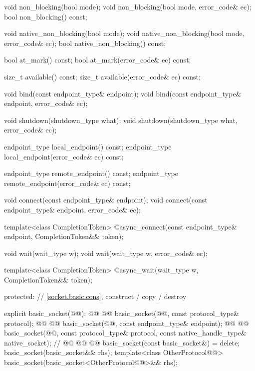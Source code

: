 \begin{codeblock}
{{    void non_blocking(bool mode);
    void non_blocking(bool mode, error_code& ec);
    bool non_blocking() const;

    void native_non_blocking(bool mode);
    void native_non_blocking(bool mode, error_code& ec);
    bool native_non_blocking() const;

    bool at_mark() const;
    bool at_mark(error_code& ec) const;

    size_t available() const;
    size_t available(error_code& ec) const;

    void bind(const endpoint_type& endpoint);
    void bind(const endpoint_type& endpoint, error_code& ec);

    void shutdown(shutdown_type what);
    void shutdown(shutdown_type what, error_code& ec);

    endpoint_type local_endpoint() const;
    endpoint_type local_endpoint(error_code& ec) const;

    endpoint_type remote_endpoint() const;
    endpoint_type remote_endpoint(error_code& ec) const;

    void connect(const endpoint_type& endpoint);
    void connect(const endpoint_type& endpoint, error_code& ec);

    template<class CompletionToken>
      @\DEDUCED@ async_connect(const endpoint_type& endpoint,
                            CompletionToken&& token);

    void wait(wait_type w);
    void wait(wait_type w, error_code& ec);

    template<class CompletionToken>
      @\DEDUCED@ async_wait(wait_type w, CompletionToken&& token);

  protected:
    // \ref{socket.basic.cons}, construct / copy / destroy

    explicit basic_socket(@@);
    @@
    @@
    basic_socket(@@, const protocol_type& protocol);
    @@
    @@
    basic_socket(@@, const endpoint_type& endpoint);
    @@
    @@
    basic_socket(@@, const protocol_type& protocol,
                 const native_handle_type& native_socket); // \nativeref
    @@
    @@
    @@
    basic_socket(const basic_socket&) = delete;
    basic_socket(basic_socket&& rhs);
    template<class OtherProtocol@@>
      basic_socket(basic_socket<OtherProtocol@@>&& rhs);

}}
\end{codeblock}

